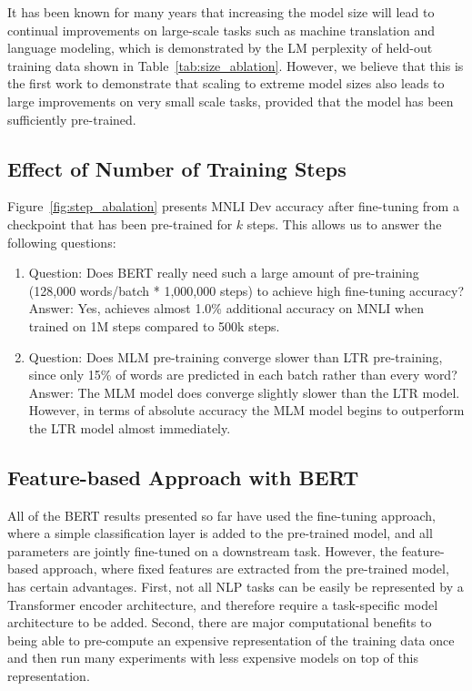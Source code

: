 It has been known for many years that increasing the model size will lead to continual improvements on large-scale tasks such as machine translation and language modeling, which is demonstrated by the LM perplexity of held-out training data shown in Table~\ref{tab:size_ablation}. However, we believe that this is the first work to demonstrate that scaling to extreme model sizes also leads to large improvements on very small scale tasks, provided that the model has been sufficiently pre-trained.

\subsection{Effect of Number of Training Steps}
\label{sec:num_training_steps}

Figure~\ref{fig:step_abalation} presents MNLI Dev accuracy after fine-tuning from a checkpoint that has been pre-trained for $k$ steps. This allows us to answer the following questions:

\begin{enumerate}
\item Question: Does BERT really need such a large amount of pre-training (128,000 words/batch * 1,000,000 steps) to achieve high fine-tuning accuracy? \\
Answer: Yes, \bertbase achieves almost 1.0\% additional accuracy on MNLI when trained on 1M steps compared to 500k steps.
\item Question: Does MLM pre-training converge slower than LTR pre-training, since only 15\% of words are predicted in each batch rather than every word? \\
Answer: The MLM model does converge slightly slower than the LTR model. However, in terms of absolute accuracy the MLM model begins to outperform the LTR model almost immediately.
\end{enumerate}



\subsection{Feature-based Approach with BERT}

All of the BERT results presented so far have used the fine-tuning approach, where a simple classification layer is added to the pre-trained model, and all parameters are jointly fine-tuned on a downstream task. However, the feature-based approach, where fixed features are extracted from the pre-trained model, has certain advantages. First, not all NLP tasks can be easily be represented by a Transformer encoder architecture, and therefore require a task-specific model architecture to be added. Second, there are major computational benefits to being able to pre-compute an expensive representation of the training data once and then run many experiments with less expensive models on top of this representation. 

